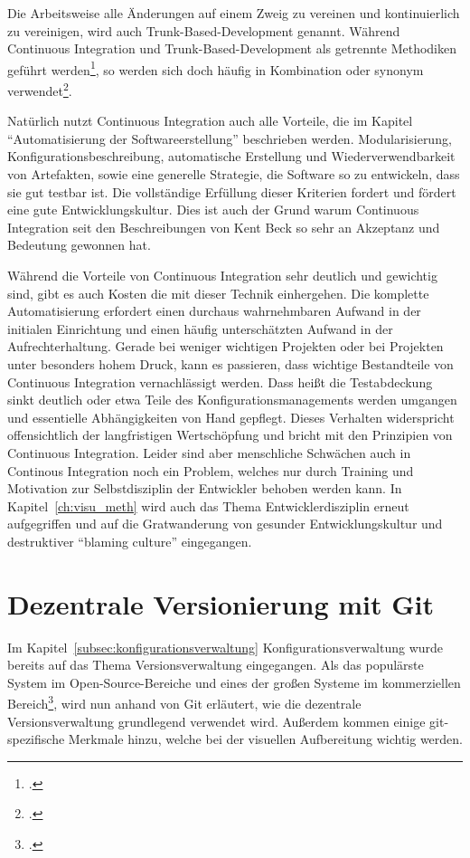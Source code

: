Die Arbeitsweise alle Änderungen auf einem Zweig zu vereinen und kontinuierlich zu vereinigen, wird auch Trunk-Based-Development genannt. Während Continuous Integration und Trunk-Based-Development als getrennte Methodiken geführt werden\footcite{trunkbaseddevelopment}, so werden sich doch häufig in Kombination oder synonym verwendet\footcite{fowler-feature-branch}.

Natürlich nutzt Continuous Integration auch alle Vorteile, die im Kapitel ``Automatisierung der Softwareerstellung'' beschrieben werden. Modularisierung, Konfigurationsbeschreibung, automatische Erstellung und Wiederverwendbarkeit von Artefakten, sowie eine generelle Strategie, die Software so zu entwickeln, dass sie gut testbar ist. Die vollständige Erfüllung dieser Kriterien fordert und fördert eine gute Entwicklungskultur. Dies ist auch der Grund warum Continuous Integration seit den Beschreibungen von Kent Beck so sehr an Akzeptanz und Bedeutung gewonnen hat.

Während die Vorteile von Continuous Integration sehr deutlich und gewichtig sind, gibt es auch Kosten die mit dieser Technik einhergehen. Die komplette Automatisierung erfordert einen durchaus wahrnehmbaren Aufwand in der initialen Einrichtung und einen häufig unterschätzten Aufwand in der Aufrechterhaltung. Gerade bei weniger wichtigen Projekten oder bei Projekten unter besonders hohem Druck, kann es passieren, dass wichtige Bestandteile von Continuous Integration vernachlässigt werden. Dass heißt die Testabdeckung sinkt deutlich oder etwa Teile des Konfigurationsmanagements werden umgangen und essentielle Abhängigkeiten von Hand gepflegt. Dieses Verhalten widerspricht offensichtlich der langfristigen Wertschöpfung und bricht mit den Prinzipien von Continuous Integration. Leider sind aber menschliche Schwächen auch in Continous Integration noch ein Problem, welches nur durch Training und Motivation zur Selbstdisziplin der Entwickler behoben werden kann. In Kapitel~\ref{ch:visu_meth} wird auch das Thema Entwicklerdisziplin erneut aufgegriffen und auf die Gratwanderung von gesunder Entwicklungskultur und destruktiver ``blaming culture'' eingegangen.

\section{Dezentrale Versionierung mit Git}

Im Kapitel~\ref{subsec:konfigurationsverwaltung} Konfigurationsverwaltung wurde bereits auf das Thema Versionsverwaltung eingegangen. Als das populärste System im Open-Source-Bereiche und eines der großen Systeme im kommerziellen Bereich\footcite{g2crowd2018}, wird nun anhand von Git erläutert, wie die dezentrale Versionsverwaltung grundlegend verwendet wird. Außerdem kommen einige git-spezifische Merkmale hinzu, welche bei der visuellen Aufbereitung wichtig werden.

